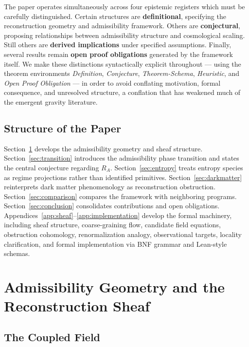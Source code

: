 \documentclass[11pt, a4paper]{article}
\theoremstyle{plain}
\theoremstyle{definition}
\theoremstyle{remark}
\newcommand{\RA}{R_{\!A}}
\begin{document}
The paper operates simultaneously across four epistemic registers which must be
carefully distinguished. Certain structures are \textbf{definitional}, specifying
the reconstruction geometry and admissibility framework. Others are
\textbf{conjectural}, proposing relationships between admissibility structure and
cosmological scaling. Still others are \textbf{derived implications} under specified
assumptions. Finally, several results remain \textbf{open proof obligations}
generated by the framework itself. We make these distinctions syntactically explicit
throughout --- using the theorem environments \emph{Definition}, \emph{Conjecture},
\emph{Theorem-Schema}, \emph{Heuristic}, and \emph{Open Proof Obligation} --- in
order to avoid conflating motivation, formal consequence, and unresolved structure, a
conflation that has weakened much of the emergent gravity literature.

\subsection*{Structure of the Paper}

Section~\ref{sec:geometry} develops the admissibility geometry and sheaf structure.
Section~\ref{sec:transition} introduces the admissibility phase transition and states
the central conjecture regarding $\RA$. Section~\ref{sec:entropy} treats entropy
species as regime projections rather than identified primitives.
Section~\ref{sec:darkmatter} reinterprets dark matter phenomenology as reconstruction
obstruction. Section~\ref{sec:comparison} compares the framework with neighboring
programs. Section~\ref{sec:conclusion} consolidates contributions and open
obligations. Appendices~\ref{app:sheaf}--\ref{app:implementation} develop the formal
machinery, including sheaf structure, coarse-graining flow, candidate field equations,
obstruction cohomology, renormalization analogy, observational targets, locality
clarification, and formal implementation via BNF grammar and Lean-style schemas.

\section{Admissibility Geometry and the Reconstruction Sheaf}
\label{sec:geometry}

\subsection{The Coupled Field}
\end{document}
